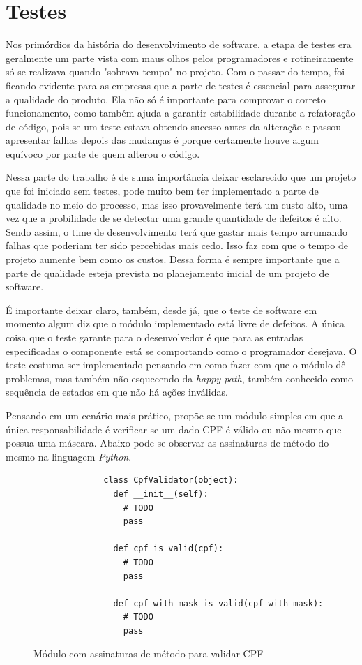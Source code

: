 \documentclass[
    12pt,       %
    openright,      %
    twoside,      %
    a4paper,      %
    english,      %
    french,       %
    spanish,      %
    brazil,       %
    ]{abntex2}
\begin{document}
  \chapter{Testes}
      Nos primórdios da história do desenvolvimento de software, a etapa de testes
      era geralmente um parte vista com maus olhos pelos programadores e rotineiramente
      só se realizava quando "sobrava tempo" no projeto. Com o passar do tempo, foi
      ficando evidente para as empresas que a parte de testes é essencial para
      assegurar a qualidade do produto. Ela não só é importante para comprovar
      o correto funcionamento, como também ajuda a garantir estabilidade durante a
      refatoração de código, pois se um teste estava obtendo sucesso antes da
      alteração e passou apresentar falhas depois das mudanças é porque certamente
      houve algum equívoco por parte de quem alterou o código.

      Nessa parte do trabalho é de suma importância deixar esclarecido
      que um projeto que foi iniciado sem testes, pode muito bem ter implementado
      a parte de qualidade no meio do processo, mas isso provavelmente terá um
      custo alto, uma vez que a probilidade de se detectar uma grande quantidade
      de defeitos é alto. Sendo assim, o time de desenvolvimento terá que gastar
      mais tempo arrumando falhas que poderiam ter sido percebidas mais cedo.
      Isso faz com que o tempo de projeto aumente bem como os custos. Dessa forma
      é sempre importante que a parte de qualidade esteja prevista no planejamento
      inicial de um projeto de software.

      É importante deixar claro, também, desde já, que o teste de software em momento algum
      diz que o módulo implementado está livre de defeitos. A única coisa que o
      teste garante para o desenvolvedor é que para as entradas especificadas o
      componente está se comportando como o programador desejava. O teste costuma
      ser implementado pensando em como fazer com que o módulo dê problemas, mas
      também não esquecendo da \textit{happy path}, também conhecido como sequência
      de estados em que não há ações inválidas.

      Pensando em um cenário mais prático, propõe-se um módulo simples em que a única
      responsabilidade é verificar se um dado CPF é válido ou não mesmo que possua uma
      máscara. Abaixo pode-se observar as assinaturas de método do mesmo na linguagem
      \textit{Python}.

      \begin{figure}[htbp]
          \begin{lstlisting}
              class CpfValidator(object):
                def __init__(self):
                  # TODO
                  pass

                def cpf_is_valid(cpf):
                  # TODO
                  pass

                def cpf_with_mask_is_valid(cpf_with_mask):
                  # TODO
                  pass
          \end{lstlisting}
          \caption{\label{fig:passaro}Módulo com assinaturas de método para validar CPF}
      \end{figure}
\end{document}
